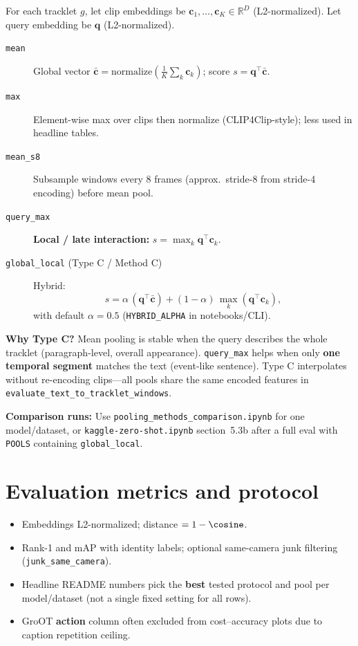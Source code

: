 \documentclass[11pt,a4paper]{article}
\begin{document}
\label{sec:pooling}

For each tracklet $g$, let clip embeddings be $\mathbf{c}_1,\ldots,\mathbf{c}_K \in \mathbb{R}^D$ (L2-normalized).
Let query embedding be $\mathbf{q}$ (L2-normalized).

\begin{description}
  \item[\texttt{mean}] Global vector $\bar{\mathbf{c}} = \mathrm{normalize}(\frac{1}{K}\sum_k \mathbf{c}_k)$; score $s = \mathbf{q}^\top \bar{\mathbf{c}}$.
  \item[\texttt{max}] Element-wise max over clips then normalize (CLIP4Clip-style); less used in headline tables.
  \item[\texttt{mean\_s8}] Subsample windows every 8 frames (approx.\ stride-8 from stride-4 encoding) before mean pool.
  \item[\texttt{query\_max}] \textbf{Local / late interaction:} $s = \max_k \mathbf{q}^\top \mathbf{c}_k$.
  \item[\texttt{global\_local} (Type C / Method C)] Hybrid:
  \[
  s = \alpha\, (\mathbf{q}^\top \bar{\mathbf{c}}) + (1-\alpha)\, \max_k (\mathbf{q}^\top \mathbf{c}_k),
  \]
  with default $\alpha = 0.5$ (\texttt{HYBRID\_ALPHA} in notebooks/CLI).
\end{description}

\textbf{Why Type C?}
Mean pooling is stable when the query describes the whole tracklet (paragraph-level, overall appearance).
\texttt{query\_max} helps when only \textbf{one temporal segment} matches the text (event-like sentence).
Type C interpolates without re-encoding clips---all pools share the same encoded features in \texttt{evaluate\_text\_to\_tracklet\_windows}.

\textbf{Comparison runs:}
Use \texttt{pooling\_methods\_comparison.ipynb} for one model/dataset, or \texttt{kaggle-zero-shot.ipynb} section~5.3b after a full eval with \texttt{POOLS} containing \texttt{global\_local}.

\section{Evaluation metrics and protocol}

\begin{itemize}[noitemsep]
  \item Embeddings L2-normalized; distance $= 1 - \cosine$.
  \item Rank-1 and mAP with identity labels; optional same-camera junk filtering (\texttt{junk\_same\_camera}).
  \item Headline README numbers pick the \textbf{best} tested protocol and pool per model/dataset (not a single fixed setting for all rows).
  \item GroOT \textbf{action} column often excluded from cost--accuracy plots due to caption repetition ceiling.
\end{itemize}
\end{document}
